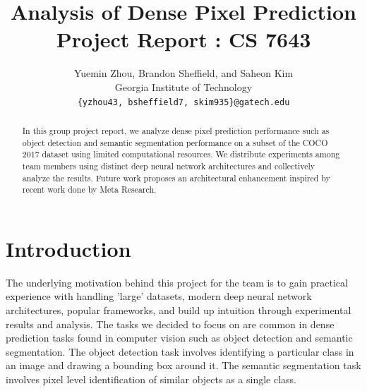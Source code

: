 \documentclass[10pt,twocolumn,letterpaper]{article}
\begin{document}
\title{Analysis of Dense Pixel Prediction Project Report : CS 7643}

\author{Yuemin Zhou, Brandon Sheffield, and Saheon Kim \\
Georgia Institute of Technology\\
{\tt\small \{yzhou43, bsheffield7, skim935\}@gatech.edu}
}

\maketitle

\begin{abstract}
   In this group project report, we analyze dense pixel prediction performance such as object detection and semantic segmentation performance on a subset of the COCO 2017 dataset using limited computational resources. We distribute experiments among team members using distinct deep neural network architectures and collectively analyze the results. Future work proposes an architectural enhancement inspired by recent work done by Meta Research.
\end{abstract}

\section{Introduction}


The underlying motivation behind this project for the team is to gain practical experience with handling 'large' datasets, modern deep neural network architectures, popular frameworks, and build up intuition through experimental results and analysis. The tasks we decided to focus on are common in dense prediction tasks\cite{vandenhende2021multi} found in computer vision such as object detection\cite{zaidi2022survey} and semantic segmentation\cite{lateef2019survey}. The object detection task involves identifying a particular class in an image and drawing a bounding box around it. The semantic segmentation task involves pixel level identification of similar objects as a single class.
\end{document}
